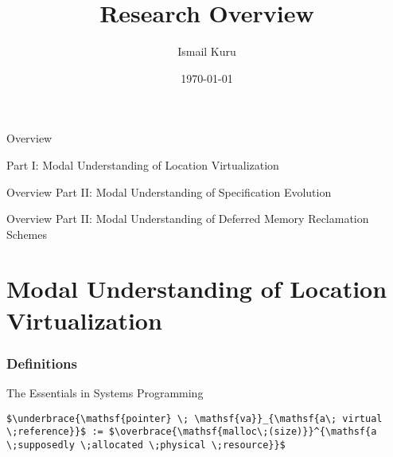 \documentclass[aspectratio=169,xcolor=dvipsnames]{beamer}
\title{Research Overview}
\subtitle{}
\author{Ismail Kuru}
\institute
{
}
\date{\today} %
\newcommand{\makepart}[1]{ %
\part{#1} \frame{\partpage}
}
\begin{document}
\begin{frame}
    \titlepage
\end{frame}

\begin{frame}{Overview}

Part I: Modal Understanding of Location Virtualization
\tableofcontents[part=1]

\end{frame}
\begin{frame}{Overview}
Part II: Modal Understanding of Specification Evolution
\tableofcontents[part=2]
   
\end{frame}
\begin{frame}{Overview}
Part II: Modal Understanding of Deferred Memory Reclamation Schemes
\tableofcontents[part=2]
   
\end{frame}
\makepart{Modal Understanding of Location Virtualization}


\section{Definitions}

\begin{frame}[fragile]{The Essentials in Systems Programming}
\begin{lstlisting}[style=CStyle,mathescape]
    $\underbrace{\mathsf{pointer} \; \mathsf{va}}_{\mathsf{a\; virtual \;reference}}$ := $\overbrace{\mathsf{malloc\;(size)}}^{\mathsf{a \;supposedly \;allocated \;physical \;resource}}$
\end{lstlisting}
\end{frame}
\end{document}
